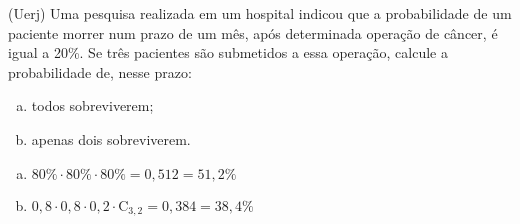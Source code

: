 \begin{ex}
 (Uerj) Uma pesquisa realizada em um hospital indicou que a probabilidade de um paciente morrer num prazo de um mês, após determinada operação de câncer, é igual a 20\%. Se três pacientes são submetidos a essa operação, calcule a probabilidade de, nesse prazo:
   \begin{enumerate}[(a)]
   \item todos sobreviverem;
   \item apenas dois sobreviverem.
   \end{enumerate}
     \begin{sol}
      \phantom{A}  
       \begin{enumerate} [(a)]
           \item $80\%\cdot80\%\cdot80\%=0,512=51,2\%$
           \item $0,8\cdot0,8\cdot0,2\cdot\mathrm{C}_{3,2}=0,384=38,4\%$
       \end{enumerate}
     \end{sol}
\end{ex}